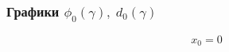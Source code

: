 \documentclass[fullscreen=true, unicode, bookmarks=false]{beamer}
\begin{document}
\begin{frame}
\frametitle { Графики $ \phi_0(\gamma), \; d_0(\gamma) $ }

\begin{figure}[h]
\hspace{-4cm}
\begin{minipage}[h]{0.2\linewidth}
\end{minipage}
\hspace{3.5cm}
\begin{minipage}[h]{0.2\linewidth}
\end{minipage}
\end{figure}

$$ x_0=0 $$

\end{frame}
\end{document}

